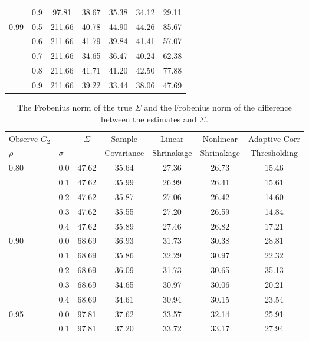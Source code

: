 \begin{table}[htbp]
\begin{tabular}{ll|ccccc}
                     &0.9 &97.81 &38.67 &35.38 &34.12 &29.11 \\
                0.99 &0.5 &211.66 &40.78 &44.90 &44.26 &85.67 \\
                     &0.6 &211.66 &41.79 &39.84 &41.41 &57.07 \\
                     &0.7 &211.66 &34.65 &36.47 &40.24 &62.38 \\
                     &0.8 &211.66 &41.71 &41.20 &42.50 &77.88 \\
                     &0.9 &211.66 &39.22 &33.44 &38.06 &47.69 \\
                \bottomrule
                \end{tabular}      
        \end{table}
        
        \begin{table}
                \caption{The Frobenius norm of the true \(\Sigma\) and the Frobenius norm of the difference between the estimates and \(\Sigma\).}
            \begin{tabular}{ll|ccccc}
                \toprule
                   Observe \(G_{2}\) && \(\Sigma\) &Sample  &Linear  &Nonlinear &Adaptive Corr \\
                \(\rho\) &\(\sigma\) &&Covariance&Shrinakage&Shrinakage&Thresholding\\
                \midrule
                0.80 &0.0 &47.62 &35.64 &27.36 &26.73 &15.46 \\
                     &0.1 &47.62 &35.99 &26.99 &26.41 &15.61 \\
                     &0.2 &47.62 &35.87 &27.06 &26.42 &14.60 \\
                     &0.3 &47.62 &35.55 &27.20 &26.59 &14.84 \\
                     &0.4 &47.62 &35.89 &27.46 &26.82 &17.21 \\
                0.90 &0.0 &68.69 &36.93 &31.73 &30.38 &28.81 \\
                     &0.1 &68.69 &35.86 &32.29 &30.97 &22.32 \\
                     &0.2 &68.69 &36.09 &31.73 &30.65 &35.13 \\
                     &0.3 &68.69 &34.65 &30.97 &30.06 &20.21 \\
                     &0.4 &68.69 &34.61 &30.94 &30.15 &23.54 \\
                0.95 &0.0 &97.81 &37.62 &33.57 &32.14 &25.91 \\
                     &0.1 &97.81 &37.20 &33.72 &33.17 &27.94 \\

\end{tabular}
\end{table}
